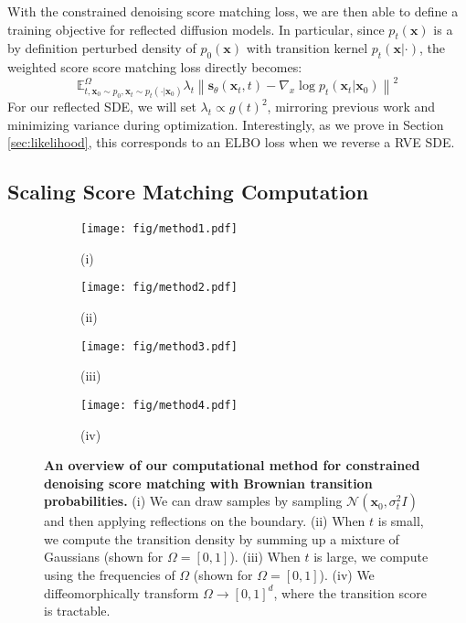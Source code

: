 \documentclass{article}
\theoremstyle{plain}
\theoremstyle{definition}
\theoremstyle{remark}
\newcommand{\E}{\mathbb{E}}
\newcommand{\norm}[1]{\left\|#1\right\|}
\newcommand{\grad}{\nabla}
\renewcommand{\vec}{\mathbf}
\begin{document}
With the constrained denoising score matching loss, we are then able to define a training objective for reflected diffusion models. In particular, since $p_t(\vec{x})$ is a by definition perturbed density of $p_0(\vec{x})$ with transition kernel $p_t(\vec{x} | \cdot)$, the weighted score score matching loss directly becomes:
\begin{equation}\label{eqn:wcdsm}
    \E_{t, \vec{x}_0 \sim p_0, \vec{x}_t \sim p_t (\cdot | \vec{x}_0)}^\Omega \lambda_t \norm{\vec{s}_\theta(\vec{x}_t, t) - \grad_x \log p_t(\vec{x}_t | \vec{x}_0)}^2
\end{equation}
For our reflected SDE, we will set $\lambda_t \propto g(t)^2$, mirroring previous work and minimizing variance during optimization. Interestingly, as we prove in Section \ref{sec:likelihood}, this corresponds to an ELBO loss when we reverse a RVE SDE.

\subsection{Scaling Score Matching Computation}\label{sec:sm:scaling}

\begin{figure*}[h]
    \centering
    \begin{subfigure}[b]{0.24\textwidth}
        \texttt{[image: fig/method1.pdf]}
        \caption*{(i)}
    \end{subfigure}
    \hfill
    \begin{subfigure}[b]{0.24\textwidth}
        \texttt{[image: fig/method2.pdf]}
        \caption*{(ii)}
    \end{subfigure}
    \hfill
    \begin{subfigure}[b]{0.24\textwidth}
        \texttt{[image: fig/method3.pdf]}
        \caption*{(iii)}
    \end{subfigure}
    \hfill
    \begin{subfigure}[b]{0.24\textwidth}
        \texttt{[image: fig/method4.pdf]}
        \caption*{(iv)}
    \end{subfigure}
    \caption{\textbf{An overview of our computational method for constrained denoising score matching with Brownian transition probabilities.} (i) We can draw samples by sampling $\mathcal{N}(\vec{x}_0, \sigma_t^2 I)$ and then applying reflections on the boundary. (ii) When $t$ is small, we compute the transition density by summing up a mixture of Gaussians (shown for $\Omega = [0, 1]$). (iii) When $t$ is large, we compute using the frequencies of $\Omega$ (shown for $\Omega = [0, 1]$). (iv) We diffeomorphically transform $\Omega \to [0, 1]^d$, where the transition score is tractable.}\label{fig:rhk}
\end{figure*}
\end{document}
